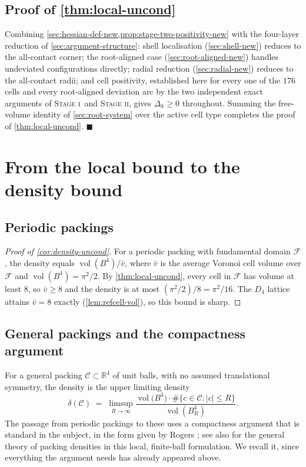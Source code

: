 \documentclass[11pt,reqno]{amsart}
\renewcommand{\_}{\origunderscore\allowbreak}
\numberwithin{equation}{section}
\theoremstyle{plain}
\theoremstyle{definition}
\theoremstyle{remark}
\newcommand{\defect}{\Delta}                 %
\newcommand{\stageone}{\textnormal{\scshape Stage i}}
\newcommand{\stagetwo}{\textnormal{\scshape Stage ii}}
\DeclareMathOperator{\vol}{vol}
\begin{document}
\subsection{Proof of \texorpdfstring{\cref{thm:local-uncond}}{the single-deviation theorem}}

Combining \cref{sec:hessian-def-new,prop:stage-two-positivity-new} with
the four-layer reduction of \cref{sec:argument-structure}: shell
localisation (\cref{sec:shell-new}) reduces to the all-contact corner;
the root-aligned case (\cref{sec:root-aligned-new}) handles
undeviated configurations directly; radial reduction
(\cref{sec:radial-new}) reduces to the all-contact radii; and cell
positivity, established here for every one of the $176$ cells and
every root-aligned deviation arc by the two independent exact arguments
of \stageone\ and \stagetwo, gives $\defect_k\ge0$ throughout. Summing
the free-volume identity of \cref{sec:root-system} over the active cell
type completes the proof of \cref{thm:local-uncond}. $\blacksquare$
\section{From the local bound to the density bound}\label{sec:density-derivation}

\subsection{Periodic packings}\label{sec:periodic-intro-new}

\begin{proof}[Proof of \cref{cor:density-uncond}]
For a periodic packing with fundamental domain $\mathcal{F}$, the
density equals $\vol(B^4)/\bar v$, where $\bar v$ is the average
Voronoi cell volume over $\mathcal{F}$ and $\vol(B^4)=\pi^2/2$. By
\cref{thm:local-uncond}, every cell in $\mathcal{F}$ has volume at
least $8$, so $\bar v\ge8$ and the density is at most
$(\pi^2/2)/8=\pi^2/16$. The $D_4$ lattice attains $\bar v=8$ exactly
(\cref{lem:refcell-vol}), so this bound is sharp.
\end{proof}

\subsection{General packings and the compactness argument}\label{sec:periodic}

For a general packing $\mathcal{C}\subset\mathbb{R}^4$ of unit balls,
with no assumed translational symmetry, the density is the upper
limiting density
\[
  \delta(\mathcal{C}) \;=\; \limsup_{R\to\infty}
  \frac{\vol\bigl(B^4\bigr)\cdot\#\{c\in\mathcal{C}:|c|\le R\}}{\vol(B_R^4)} .
\]
The passage from periodic packings to these uses a compactness argument
that is standard in the subject, in the form given by Rogers
\cite{Rog64}; see also \cite{Gru87} for the general theory of packing
densities in this local, finite-ball formulation. We recall it, since
everything the argument needs has already appeared above.
\end{document}
